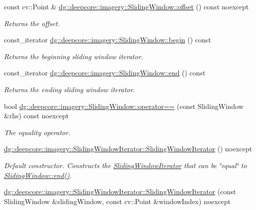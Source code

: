 \begin{DoxyCompactItemize}
const cv\+::\+Point \& \hyperlink{group___imagery_module_gaab719997b423835ef06be24b605a9bc6}{dg\+::deepcore\+::imagery\+::\+Sliding\+Window\+::offset} () const noexcept
\begin{DoxyCompactList}\small\item\em Returns the offset. \end{DoxyCompactList}\item 
const\+\_\+iterator \hyperlink{group___imagery_module_ga935a8a28313d10b815762aeb92e78629}{dg\+::deepcore\+::imagery\+::\+Sliding\+Window\+::begin} () const 
\begin{DoxyCompactList}\small\item\em Returns the beginning sliding window iterator. \end{DoxyCompactList}\item 
const\+\_\+iterator \hyperlink{group___imagery_module_ga1c962ee19d65114b9213d2aea33503a6}{dg\+::deepcore\+::imagery\+::\+Sliding\+Window\+::end} () const 
\begin{DoxyCompactList}\small\item\em Returns the ending sliding window iterator. \end{DoxyCompactList}\item 
bool \hyperlink{group___imagery_module_ga771dbe2b22ec6f714c0c707ed7a63c1f}{dg\+::deepcore\+::imagery\+::\+Sliding\+Window\+::operator==} (const Sliding\+Window \&rhs) const noexcept
\begin{DoxyCompactList}\small\item\em The equality operator. \end{DoxyCompactList}\item 
\hyperlink{group___imagery_module_gaa72789bec6d0d49fe87408e224739d23}{dg\+::deepcore\+::imagery\+::\+Sliding\+Window\+Iterator\+::\+Sliding\+Window\+Iterator} () noexcept
\begin{DoxyCompactList}\small\item\em Default constructor. Constructs the \hyperlink{classdg_1_1deepcore_1_1imagery_1_1_sliding_window_iterator}{Sliding\+Window\+Iterator} that can be \char`\"{}equal\char`\"{} to \hyperlink{group___imagery_module_ga1c962ee19d65114b9213d2aea33503a6}{Sliding\+Window\+::end()}. \end{DoxyCompactList}\item 
\hyperlink{group___imagery_module_ga7493aa55008e090f05fcb47bd53d6098}{dg\+::deepcore\+::imagery\+::\+Sliding\+Window\+Iterator\+::\+Sliding\+Window\+Iterator} (const Sliding\+Window \&sliding\+Window, const cv\+::\+Point \&window\+Index) noexcept

\end{DoxyCompactItemize}
